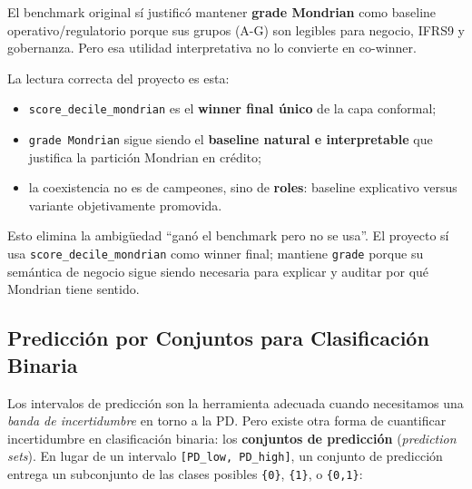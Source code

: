 \documentclass[
  spanish,
  11pt,
  letterpaper,
]{scrbook}
\providecommand{\tightlist}{%
  \setlength{\itemsep}{0pt}\setlength{\parskip}{0pt}}
\theoremstyle{plain}
\theoremstyle{remark}
\begin{document}
\begin{tcolorbox}[enhanced jigsaw, arc=.35mm, bottomrule=.15mm, bottomtitle=1mm, breakable, colback=white, colbacktitle=quarto-callout-tip-color!10!white, colframe=quarto-callout-tip-color-frame, coltitle=black, left=2mm, leftrule=.75mm, opacityback=0, opacitybacktitle=0.6, rightrule=.15mm, title=\textcolor{quarto-callout-tip-color}{\faLightbulb}\hspace{0.5em}{Un winner final y un baseline necesario}, titlerule=0mm, toprule=.15mm, toptitle=1mm]

El benchmark original sí justificó mantener \textbf{grade Mondrian} como
baseline operativo/regulatorio porque sus grupos (A-G) son legibles para
negocio, IFRS9 y gobernanza. Pero esa utilidad interpretativa no lo
convierte en co-winner.

La lectura correcta del proyecto es esta:

\begin{itemize}
\tightlist
\item
  \texttt{score\_decile\_mondrian} es el \textbf{winner final único} de
  la capa conformal;
\item
  \texttt{grade\ Mondrian} sigue siendo el \textbf{baseline natural e
  interpretable} que justifica la partición Mondrian en crédito;
\item
  la coexistencia no es de campeones, sino de \textbf{roles}: baseline
  explicativo versus variante objetivamente promovida.
\end{itemize}

Esto elimina la ambigüedad ``ganó el benchmark pero no se usa''. El
proyecto sí usa \texttt{score\_decile\_mondrian} como winner final;
mantiene \texttt{grade} porque su semántica de negocio sigue siendo
necesaria para explicar y auditar por qué Mondrian tiene sentido.

\end{tcolorbox}

\subsection{Predicción por Conjuntos para Clasificación
Binaria}\label{sec-classification-sets}

Los intervalos de predicción son la herramienta adecuada cuando
necesitamos una \emph{banda de incertidumbre} en torno a la PD. Pero
existe otra forma de cuantificar incertidumbre en clasificación binaria:
los \textbf{conjuntos de predicción} (\emph{prediction sets}). En lugar
de un intervalo \texttt{{[}PD\_low,\ PD\_high{]}}, un conjunto de
predicción entrega un subconjunto de las clases posibles \texttt{\{0\}},
\texttt{\{1\}}, o \texttt{\{0,1\}}:
\end{document}
